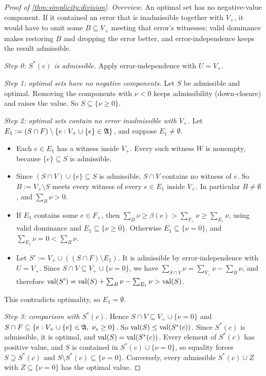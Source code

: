 \begin{proof}[Proof of \cref{thm:simplicity:division}]
\emph{Overview.} An optimal set has no negative-value component. If it contained an error that is inadmissible together with $V_+$, it would have to omit some $B\subseteq V_+$ meeting that error's witnesses; valid dominance makes restoring $B$ and dropping the error better, and error-independence keeps the result admissible.

\emph{Step 0: $S^*(c)$ is admissible.} Apply error-independence with $U=V_+$.

\emph{Step 1: optimal sets have no negative components.} Let $S$ be admissible and optimal. Removing the components with $\nu<0$ keeps admissibility (down-closure) and raises the value. So $S\subseteq\{\nu\ge0\}$.

\emph{Step 2: optimal sets contain no error inadmissible with $V_+$.} Let $E_1:=(S\cap F)\setminus\{e:V_+\cup\{e\}\in\mathfrak A\}$, and suppose $E_1\neq\emptyset$.
\begin{itemize}
\item Each $e\in E_1$ has a witness inside $V_+$. Every such witness $W$ is nonempty, because $\{e\}\subseteq S$ is admissible.
\item Since $(S\cap V)\cup\{e\}\subseteq S$ is admissible, $S\cap V$ contains no witness of $e$. So $B:=V_+\setminus S$ meets every witness of every $e\in E_1$ inside $V_+$. In particular $B\neq\emptyset$, and $\sum_B\nu>0$.
\item If $E_1$ contains some $e\in F_+$, then $\sum_B\nu\ge\beta(e)>\sum_{F_+}\nu\ge\sum_{E_1}\nu$, using valid dominance and $E_1\subseteq\{\nu\ge0\}$. Otherwise $E_1\subseteq\{\nu=0\}$, and $\sum_{E_1}\nu=0<\sum_B\nu$.
\item Let $S':=V_+\cup((S\cap F)\setminus E_1)$. It is admissible by error-independence with $U=V_+$. Since $S\cap V\subseteq V_+\cup\{\nu=0\}$, we have $\sum_{S\cap V}\nu=\sum_{V_+}\nu-\sum_B\nu$, and therefore $\mathrm{val}(S')=\mathrm{val}(S)+\sum_B\nu-\sum_{E_1}\nu>\mathrm{val}(S)$.
\end{itemize}
This contradicts optimality, so $E_1=\emptyset$.

\emph{Step 3: comparison with $S^*(c)$.} Hence $S\cap V\subseteq V_+\cup\{\nu=0\}$ and $S\cap F\subseteq\{e:V_+\cup\{e\}\in\mathfrak A,\ \nu_e\ge0\}$. So $\mathrm{val}(S)\le\mathrm{val}(S^*(c))$. Since $S^*(c)$ is admissible, it is optimal, and $\mathrm{val}(S)=\mathrm{val}(S^*(c))$. Every element of $S^*(c)$ has positive value, and $S$ is contained in $S^*(c)\cup\{\nu=0\}$, so equality forces $S\supseteq S^*(c)$ and $S\setminus S^*(c)\subseteq\{\nu=0\}$. Conversely, every admissible $S^*(c)\cup Z$ with $Z\subseteq\{\nu=0\}$ has the optimal value.


\end{proof}
